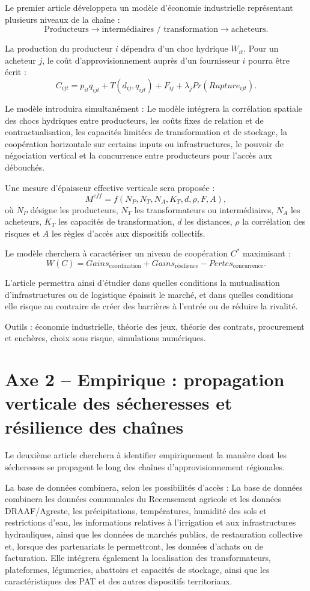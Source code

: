 \documentclass[11pt,a4paper]{article}
\begin{document}
Le premier article développera un modèle d'économie industrielle représentant plusieurs niveaux de la chaîne :
\[
\text{Producteurs}
\rightarrow
\text{intermédiaires / transformation}
\rightarrow
\text{acheteurs}.
\]

La production du producteur \(i\) dépendra d'un choc hydrique \(W_{it}\). Pour un acheteur \(j\), le coût d'approvisionnement auprès d'un fournisseur \(i\) pourra être écrit :
\[
C_{ijt}=p_{it}q_{ijt}+T(d_{ij},q_{ijt})+F_{ij}
+\lambda_j Pr(Rupture_{ijt}).
\]

Le modèle introduira simultanément :
Le modèle intégrera la corrélation spatiale des chocs hydriques entre producteurs, les coûts fixes de relation et de contractualisation, les capacités limitées de transformation et de stockage, la coopération horizontale sur certains inputs ou infrastructures, le pouvoir de négociation vertical et la concurrence entre producteurs pour l'accès aux débouchés.

Une mesure d'épaisseur effective verticale sera proposée :
\[
M^{eff}=f(N_P,N_T,N_A,K_T,d,\rho,F,A),
\]
où \(N_P\) désigne les producteurs, \(N_T\) les transformateurs ou intermédiaires, \(N_A\) les acheteurs, \(K_T\) les capacités de transformation, \(d\) les distances, \(\rho\) la corrélation des risques et \(A\) les règles d'accès aux dispositifs collectifs.

Le modèle cherchera à caractériser un niveau de coopération \(C^*\) maximisant :
\[
W(C)=Gains_{\text{coordination}}
+Gains_{\text{résilience}}
-Pertes_{\text{concurrence}}.
\]

L'article permettra ainsi d'étudier dans quelles conditions la mutualisation d'infrastructures ou de logistique épaissit le marché, et dans quelles conditions elle risque au contraire de créer des barrières à l'entrée ou de réduire la rivalité.

Outils : économie industrielle, théorie des jeux, théorie des contrats, procurement et enchères, choix sous risque, simulations numériques.

\section{Axe 2 -- Empirique : propagation verticale des sécheresses et résilience des chaînes}

Le deuxième article cherchera à identifier empiriquement la manière dont les sécheresses se propagent le long des chaînes d'approvisionnement régionales.

La base de données combinera, selon les possibilités d'accès :
La base de données combinera les données communales du Recensement agricole et les données DRAAF/Agreste, les précipitations, températures, humidité des sols et restrictions d'eau, les informations relatives à l'irrigation et aux infrastructures hydrauliques, ainsi que les données de marchés publics, de restauration collective et, lorsque des partenariats le permettront, les données d'achats ou de facturation. Elle intégrera également la localisation des transformateurs, plateformes, légumeries, abattoirs et capacités de stockage, ainsi que les caractéristiques des PAT et des autres dispositifs territoriaux.
\end{document}
